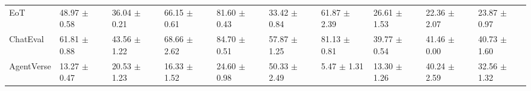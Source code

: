 \begin{table*}[htbp]
{\begin{tabular}{l|lllllllll}
EoT & \cellcolor{LightBlue}48.97 $\pm$ 0.58 & \cellcolor{LightBlue}36.04 $\pm$ 0.21 & \cellcolor{LightBlue}66.15 $\pm$ 0.61 & \cellcolor{LightBlue}81.60 $\pm$ 0.43 & \cellcolor{LightBlue}33.42 $\pm$ 0.84 & \cellcolor{LightBlue}61.87 $\pm$ 2.39 & \cellcolor{LightBlue}26.61 $\pm$ 1.53 & \cellcolor{LightBlue}22.36 $\pm$ 2.07 & \cellcolor{LightBlue}23.87 $\pm$ 0.97 \\
ChatEval & \cellcolor{LightRed}61.81 $\pm$ 0.88 & \cellcolor{LightRed}43.56 $\pm$ 1.22 & \cellcolor{LightBlue}68.66 $\pm$ 2.62 & \cellcolor{LightBlue}84.70 $\pm$ 0.51 & \cellcolor{LightRed}57.87 $\pm$ 1.25 & \cellcolor{LightRed}81.13 $\pm$ 0.81 & \cellcolor{LightBlue}39.77 $\pm$ 0.54 & \cellcolor{LightRed}41.46 $\pm$ 0.00 & \cellcolor{LightBlue}40.73 $\pm$ 1.60 \\
AgentVerse & \cellcolor{LightBlue}13.27 $\pm$ 0.47 & \cellcolor{LightBlue}20.53 $\pm$ 1.23 & \cellcolor{LightBlue}16.33 $\pm$ 1.52 & \cellcolor{LightBlue}24.60 $\pm$ 0.98 & \cellcolor{LightRed}50.33 $\pm$ 2.49 & \cellcolor{LightBlue}5.47 $\pm$ 1.31 & \cellcolor{LightBlue}13.30 $\pm$ 1.26 & \cellcolor{LightRed}40.24 $\pm$ 2.59 & \cellcolor{LightBlue}32.56 $\pm$ 1.32 \\
\hline
\end{tabular}}
\end{table*}

